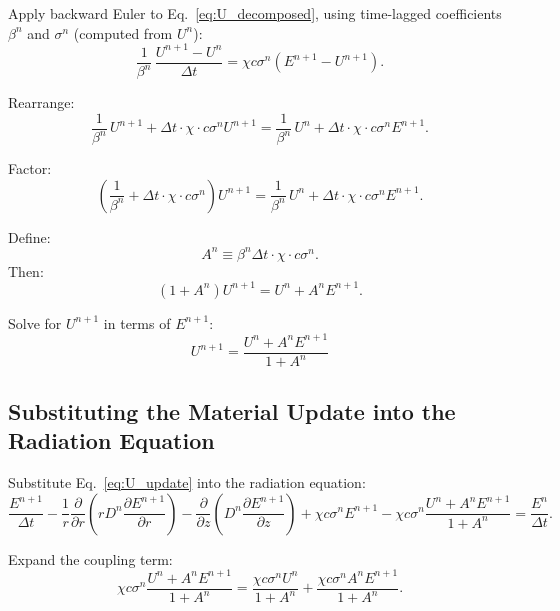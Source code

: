 \documentclass[12pt,oneside]{article}
\begin{document}
Apply backward Euler to Eq.~\eqref{eq:U_decomposed}, using time-lagged coefficients $\beta^n$ and $\sigma^n$ (computed from $U^n$):
\begin{equation}
\frac{1}{\beta^n}\,\frac{U^{n+1} - U^n}{\Delta t}
=
\chi c\sigma^n(E^{n+1} - U^{n+1}).
\end{equation}

Rearrange:
\begin{equation}
\frac{1}{\beta^n}\,U^{n+1}
+
\Delta t \cdot \chi \cdot c\sigma^n U^{n+1}
=
\frac{1}{\beta^n}\,U^n
+
\Delta t \cdot \chi \cdot c\sigma^n E^{n+1}.
\end{equation}

Factor:
\begin{equation}
\left(\frac{1}{\beta^n} + \Delta t \cdot \chi \cdot c\sigma^n\right) U^{n+1}
=
\frac{1}{\beta^n}\,U^n
+
\Delta t \cdot \chi \cdot c\sigma^n E^{n+1}.
\end{equation}

Define:
\begin{equation}
A^n
\equiv
\beta^n \Delta t \cdot \chi \cdot c\sigma^n.
\end{equation}
Then:
\begin{equation}
\left(1 + A^n\right) U^{n+1}
=
U^n
+
A^n E^{n+1}.
\end{equation}

Solve for $U^{n+1}$ in terms of $E^{n+1}$:
\begin{equation}
U^{n+1}
=
\frac{U^n + A^n E^{n+1}}{1 + A^n}
\label{eq:U_update}
\end{equation}

\subsection{Substituting the Material Update into the Radiation Equation}

Substitute Eq.~\eqref{eq:U_update} into the radiation equation:
\begin{equation}
\frac{E^{n+1}}{\Delta t}
-
\frac{1}{r}\frac{\partial}{\partial r}\left(rD^n\frac{\partial E^{n+1}}{\partial r}\right) 
-
\frac{\partial}{\partial z}\left(D^n\frac{\partial E^{n+1}}{\partial z}\right)
+
\chi c\sigma^n E^{n+1}
-
\chi c\sigma^n \frac{U^n + A^n E^{n+1}}{1 + A^n}
=
\frac{E^n}{\Delta t}.
\end{equation}

Expand the coupling term:
\begin{equation}
\chi c\sigma^n \frac{U^n + A^n E^{n+1}}{1 + A^n}
=
\frac{\chi c\sigma^n U^n}{1 + A^n}
+
\frac{\chi c\sigma^n A^n E^{n+1}}{1 + A^n}.
\end{equation}
\end{document}
